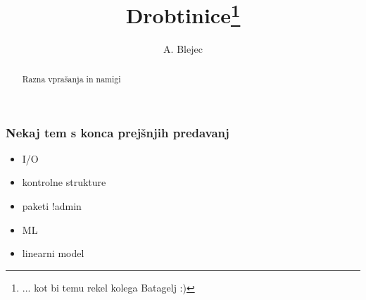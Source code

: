 \usepackage[slovene]{babel}
\usepackage[utf8]{inputenc} %
\newcommand{\SVNRevision}{$ $Rev: 3 $ $}
\newcommand{\SVNId}{$ $Id: program.Rnw 3 2009-02-22 17:36:08Z ABlejec $ $}
%
%


%
\usepackage{pgf,pgfarrows,pgfnodes,pgfautomata,pgfheaps,pgfshade}
\usepackage{amsmath,amssymb}
\usepackage{colortbl}
\usepackage{Sweave}
\usepackage{animate}

\newcommand{\BV}{}
\newcommand{\EV}{}
\newcommand{\myemph}[1]{{\color{Sgreen} \textit{#1}}}

%

\title{Drobtinice\footnote{... kot bi temu rekel kolega Batagelj :)}}
\author{A. Blejec}
%


 {\maketitle}
 {\frame{\titlepage}}
\tableofcontents
\begin{abstract}
 Razna vprašanja in namigi
\end{abstract}
\begin{frame}[fragile]
\frametitle{Nekaj tem s konca prejšnjih predavanj}
\begin{itemize}
   \item I/O
   \item kontrolne strukture
   \item paketi !admin
   \item ML
   \item linearni model
 \end{itemize}
\end{frame}
